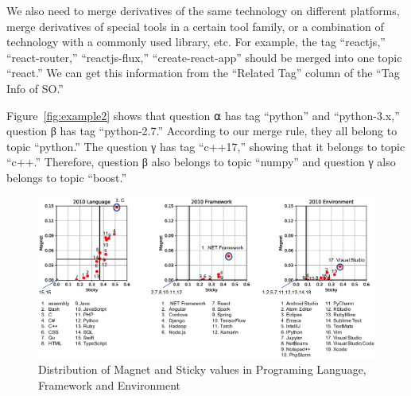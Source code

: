 \documentclass[conference]{IEEEtran}
\begin{document}
We also need to merge derivatives of the same technology on different platforms, merge derivatives of special tools in a certain tool family, or a combination of technology with a commonly used library, etc. For example, the tag ``reactjs,'' ``react-router,'' ``reactjs-flux,'' ``create-react-app'' should be merged into one topic ``react.'' We can get this information from the “Related Tag” column of the ``Tag Info of SO.''

Figure~\ref{fig:example2} shows that question ⍺ has tag ``python'' and ``python-3.x,'' question β has tag ``python-2.7.'' According to our merge rule, they all belong to topic ``python.'' The question γ has tag ``c++17,'' showing that it belongs to topic ``c++.'' Therefore, question β also belongs to topic ``numpy'' and question γ also belongs to topic ``boost.''


\begin{figure}[t]
 \centering
 \includegraphics[width=1.0\hsize]{img/2010allnew.eps}  
 \caption{Distribution of Magnet and Sticky values in Programing Language, Framework and Environment} 
 \label{fig:2010} 
\end{figure}
\end{document}
